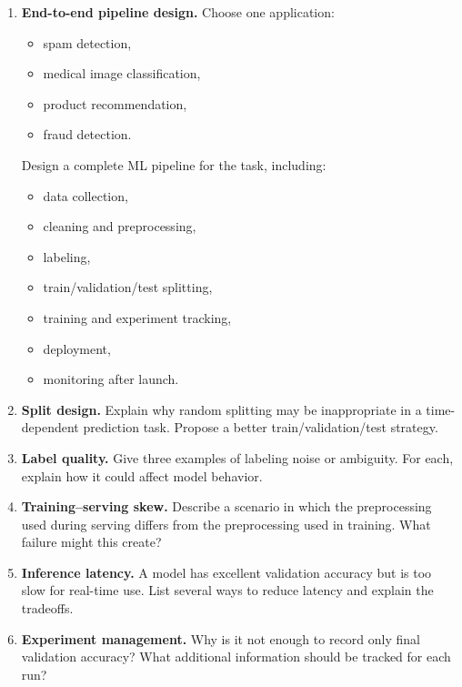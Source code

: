 \begin{enumerate}
    \item \textbf{End-to-end pipeline design.}
    Choose one application:
    \begin{itemize}
        \item spam detection,
        \item medical image classification,
        \item product recommendation,
        \item fraud detection.
    \end{itemize}
    Design a complete ML pipeline for the task, including:
    \begin{itemize}
        \item data collection,
        \item cleaning and preprocessing,
        \item labeling,
        \item train/validation/test splitting,
        \item training and experiment tracking,
        \item deployment,
        \item monitoring after launch.
    \end{itemize}

    \item \textbf{Split design.}
    Explain why random splitting may be inappropriate in a time-dependent prediction task. Propose a better train/validation/test strategy.

    \item \textbf{Label quality.}
    Give three examples of labeling noise or ambiguity. For each, explain how it could affect model behavior.

    \item \textbf{Training--serving skew.}
    Describe a scenario in which the preprocessing used during serving differs from the preprocessing used in training. What failure might this create?

    \item \textbf{Inference latency.}
    A model has excellent validation accuracy but is too slow for real-time use. List several ways to reduce latency and explain the tradeoffs.

    \item \textbf{Experiment management.}
    Why is it not enough to record only final validation accuracy? What additional information should be tracked for each run?


\end{enumerate}

